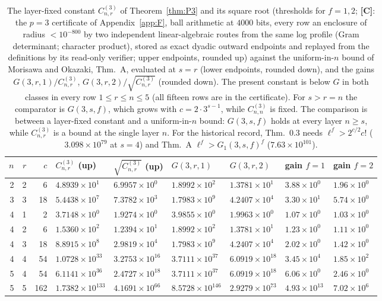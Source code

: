 \documentclass[11pt]{amsart}
\theoremstyle{remark}\newtheorem{remark}[theorem]{Remark}
\theoremstyle{definition}\newtheorem{definition}[theorem]{Definition}
\newcommand{\lbl}[1]{\textbf{[#1]}}\newcommand{\barT}{\bar T_n}
\begin{document}
\begin{table}[h]\scriptsize\centering\setlength{\tabcolsep}{3pt}
\begin{tabular}{@{}rrrllllll@{}}\toprule
$n$ & $r$ & $c$ & $C^{(3)}_{n,r}$ (up) & $\sqrt{C^{(3)}_{n,r}}$ (up) & $G(3,r,1)$ \cite{MO16} & $G(3,r,2)$ \cite{MO16} & gain $f{=}1$ & gain $f{=}2$\\ \midrule
2 & 2 & 6 & $4.8939\times10^{1}$ & $6.9957\times10^{0}$ & $1.8992\times10^{2}$ & $1.3781\times10^{1}$ & $3.88\times10^{0}$ & $1.96\times10^{0}$\\
3 & 3 & 18 & $5.4438\times10^{7}$ & $7.3782\times10^{3}$ & $1.7983\times10^{9}$ & $4.2407\times10^{4}$ & $3.30\times10^{1}$ & $5.74\times10^{0}$\\
4 & 1 & 2 & $3.7148\times10^{0}$ & $1.9274\times10^{0}$ & $3.9855\times10^{0}$ & $1.9963\times10^{0}$ & $1.07\times10^{0}$ & $1.03\times10^{0}$\\
4 & 2 & 6 & $1.5360\times10^{2}$ & $1.2394\times10^{1}$ & $1.8992\times10^{2}$ & $1.3781\times10^{1}$ & $1.23\times10^{0}$ & $1.11\times10^{0}$\\
4 & 3 & 18 & $8.8915\times10^{8}$ & $2.9819\times10^{4}$ & $1.7983\times10^{9}$ & $4.2407\times10^{4}$ & $2.02\times10^{0}$ & $1.42\times10^{0}$\\
4 & 4 & 54 & $1.0728\times10^{33}$ & $3.2753\times10^{16}$ & $3.7111\times10^{37}$ & $6.0919\times10^{18}$ & $3.45\times10^{4}$ & $1.85\times10^{2}$\\
5 & 4 & 54 & $6.1141\times10^{36}$ & $2.4727\times10^{18}$ & $3.7111\times10^{37}$ & $6.0919\times10^{18}$ & $6.06\times10^{0}$ & $2.46\times10^{0}$\\
5 & 5 & 162 & $1.7382\times10^{133}$ & $4.1691\times10^{66}$ & $8.5728\times10^{146}$ & $2.9279\times10^{73}$ & $4.93\times10^{13}$ & $7.02\times10^{6}$\\
\bottomrule\end{tabular}
\caption{The layer-fixed constant $C^{(3)}_{n,r}$ of Theorem~\ref{thm:P3} and its square root (thresholds for $f=1,2$; \lbl{C}: the $p=3$ certificate of Appendix~\ref{app:F}, ball arithmetic at $4000$ bits, every row an enclosure of radius $<10^{-800}$ by two independent linear-algebraic routes from the same log profile (Gram determinant; character product), stored as exact dyadic outward endpoints and replayed from the definitions by its read-only verifier; upper endpoints, rounded up) against the uniform-in-$n$ bound of Morisawa and Okazaki, \cite{MO16} Thm.~A, evaluated at $s=r$ (lower endpoints, rounded down), and the gains $G(3,r,1)/C^{(3)}_{n,r}$, $G(3,r,2)/\sqrt{C^{(3)}_{n,r}}$ (rounded down). The present constant is below $G$ in both classes in every row $1\le r\le n\le5$ (all fifteen rows are in the certificate). For $s>r=n$ the comparator is $G(3,s,f)$, which grows with $c=2\cdot3^{s-1}$, while $C^{(3)}_{n,n}$ is fixed. The comparison is between a layer-fixed constant and a uniform-in-$n$ bound: $G(3,s,f)$ holds at every layer $n\ge s$, while $C^{(3)}_{n,r}$ is a bound at the single layer $n$. For the historical record, \cite{MO13} Thm.~0.3 needs $\ell^f>2^{c/2}c!$ ($3.098\times10^{79}$ at $s=4$) and \cite{MO13} Thm.~A $\ell^f>G_1(3,s,f)^f$ ($7.63\times10^{101}$).}\label{tab:p3}
\end{table}
\end{document}

